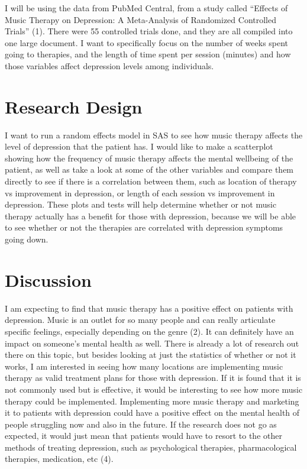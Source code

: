 \documentclass[12pt]{article}
\begin{document}
 I will be using the data from PubMed Central, from a study called “Effects of Music Therapy on Depression: A Meta-Analysis of Randomized Controlled Trials” (1). There were 55 controlled trials done, and they are all compiled into one large document. I want to specifically focus on the number of weeks spent going to therapies, and the length of time spent per session (minutes) and how those variables affect depression levels among individuals.


 \section{Research Design}
 \label{sec:research}

 I want to run a random effects model in SAS to see how music therapy affects the level of depression that the patient has. I would like to make a scatterplot showing how the frequency of music therapy affects the mental wellbeing of the patient, as well as take a look at some of the other variables and compare them directly to see if there is a correlation between them, such as location of therapy vs improvement in depression, or length of each session vs improvement in depression. These plots and tests will help determine whether or not music therapy actually has a benefit for those with depression, because we will be able to see whether or not the therapies are correlated with depression symptoms going down.

 \section{Discussion}
 \label{sec:disc}

 I am expecting to find that music therapy has a positive effect on patients with depression. Music is an outlet for so many people and can really articulate specific feelings, especially depending on the genre (2). It can definitely have an impact on someone’s mental health as well. There is already a lot of research out there on this topic, but besides looking at just the statistics of whether or not it works, I am interested in seeing how many locations are implementing music therapy as valid treatment plans for those with depression. If it is found that it is not commonly used but is effective, it would be interesting to see how more music therapy could be implemented. Implementing more music therapy and marketing it to patients with depression could have a positive effect on the mental health of people struggling now and also in the future. If the research does not go as expected, it would just mean that patients would have to resort to the other methods of treating depression, such as psychological therapies, pharmacological therapies, medication, etc (4).
\end{document}
